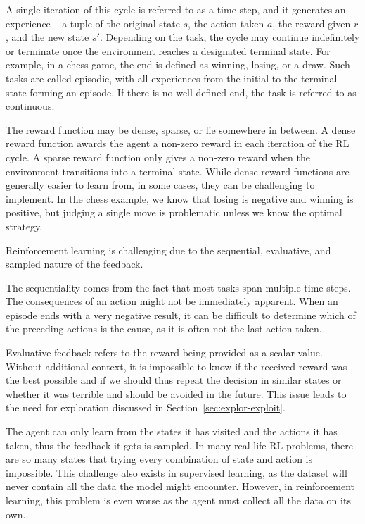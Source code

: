 \documentclass[
  digital,     %
  oneside,     %
  nosansbold,  %
  nocolorbold, %
  lof,         %
  lot,         %
]{fithesis4}
\begin{document}
A single iteration of this cycle is referred to as a time step, and it generates an experience -- a tuple of the original state $s$, the action taken $a$, the reward given $r$, and the new state $s'$. Depending on the task, the cycle may continue indefinitely or terminate once the environment reaches a designated terminal state. For example, in a chess game, the end is defined as winning, losing, or a draw. Such tasks are called episodic, with all experiences from the initial to the terminal state forming an episode. If there is no well-defined end, the task is referred to as continuous.

The reward function may be dense, sparse, or lie somewhere in between. A dense reward function awards the agent a non-zero reward in each iteration of the RL cycle. A sparse reward function only gives a non-zero reward when the environment transitions into a terminal state. While dense reward functions are generally easier to learn from, in some cases, they can be challenging to implement. In the chess example, we know that losing is negative and winning is positive, but judging a single move is problematic unless we know the optimal strategy.

Reinforcement learning is challenging due to the sequential, evaluative, and sampled nature of the feedback.

The sequentiality comes from the fact that most tasks span multiple time steps. The consequences of an action might not be immediately apparent. When an episode ends with a very negative result, it can be difficult to determine which of the preceding actions is the cause, as it is often not the last action taken.

Evaluative feedback refers to the reward being provided as a scalar value. Without additional context, it is impossible to know if the received reward was the best possible and if we should thus repeat the decision in similar states or whether it was terrible and should be avoided in the future. This issue leads to the need for exploration discussed in Section~\ref{sec:explor-exploit}.

The agent can only learn from the states it has visited and the actions it has taken, thus the feedback it gets is sampled. In many real-life RL problems, there are so many states that trying every combination of state and action is impossible. This challenge also exists in supervised learning, as the dataset will never contain all the data the model might encounter. However, in reinforcement learning, this problem is even worse as the agent must collect all the data on its own.
\end{document}
